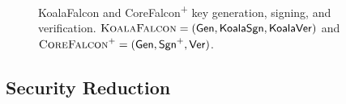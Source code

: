 \begin{figure}[!htbp]
  \caption{KoalaFalcon and CoreFalcon\textsuperscript{+} key generation, signing, and verification.
  $\textsc{KoalaFalcon}=(\mathsf{Gen},\mathsf{KoalaSgn},\mathsf{KoalaVer})$ and
  $\textsc{CoreFalcon}^{+}=(\mathsf{Gen},\mathsf{Sgn}^{+},\mathsf{Ver})$.}
  \label{fig:koalafalcon-construction}
\end{figure}
  
\begin{table}[!htbp]
  \centering
  \setlength{\fboxsep}{9pt}
  \caption{Concrete parameters for KoalaFalcon-512 and KoalaFalcon-1024.}
  \label{tab:koalafalcon-parameters}
\end{table}

\FloatBarrier
\subsection{Security Reduction}\label{modulus-invariance-in-the-reduction}

